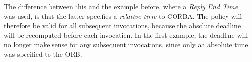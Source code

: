 The difference between this and the example before, where a
\emph{Reply End Time} was used, is that the latter specifies a
\emph{relative time} to CORBA.  The policy will therefore be valid
for all subsequent invocations, because the absolute deadline will be
recomputed before each invocation.  In the first example, the
deadline will no longer make sense for any subsequent invocations,
since only an absolute time was specified to the ORB.


